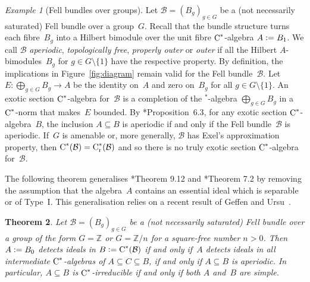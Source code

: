 \documentclass[a4paper]{amsart}
\theoremstyle{plain}
\newtheorem{theorem}{Theorem}
\theoremstyle{definition}
\theoremstyle{remark}
\newtheorem{example}[theorem]{Example}
\numberwithin{theorem}{section}
\numberwithin{equation}{section}
\newcommand*{\nb}{\nobreakdash}
\newcommand*{\Star}{\(^*\)\nobreakdash-}
\newcommand*{\Z}{\mathbb Z}
\newcommand*{\red}{\mathrm{r}}%
\newcommand*{\Cst}{\textup C^*}%
\newcommand*{\B}{\mathcal B}%
\newcommand*{\defeq}{\mathrel{\vcentcolon=}}%
\begin{document}
\begin{example}[Fell bundles over groups]
  \label{ex:group_Fell_bundles}
  Let \(\B=(B_{g})_{g\in G}\) be a (not necessarily saturated) Fell
  bundle over a group~\(G\).
  Recall that the bundle structure turns each fibre~\(B_g\) into a
  Hilbert bimodule over the unit fibre \(\Cst\)\nb-algebra \(A\defeq B_1\).
  We call \(\B\) \emph{aperiodic}, \emph{topologically free},
  \emph{properly outer} or \emph{outer} if all the Hilbert
  \(A\)\nb-bimodules~\(B_g\) for \(g\in G\setminus\{1\}\) have the
  respective property.
  By definition, the implications in Figure~\ref{fig:diagram} remain
  valid for the Fell bundle~\(\B\).
  Let \(E\colon \bigoplus_{g\in G} B_g \to A\) be the identity
  on~\(A\) and zero on~\(B_g\) for all \(g\in G\setminus \{1\}\).
  An exotic section \(\Cst\)\nb-algebra for~\(\B\) is a completion of
  the \Star{}algebra \(\bigoplus_{g\in G} B_g\) in a \(\Cst\)\nb-norm
  that makes~\(E\) bounded.
  By  \cite{Kwasniewski-Meyer:Essential}*{Proposition~6.3}, for any
  exotic section \(\Cst\)\nb-algebra~\(B\), the inclusion \(A\subseteq
  B\) is
  aperiodic if and only if the Fell bundle~\(\B\) is aperiodic.
  If~\(G\) is amenable or, more generally, \(\B\) has Exel's
  approximation property, then \(\Cst(\B)=\Cst_\red(\B)\) and so there
  is no truly exotic section \(\Cst\)\nb-algebra for~\(\B\).
\end{example}

The following theorem generalises
\cite{Kwasniewski-Meyer:Aperiodicity}*{Theorem 9.12} and
\cite{Kwasniewski-Meyer:Aperiodicity_pseudo_expectations}*{Theorem
  7.2} by removing the assumption that the algebra~\(A\) contains an
essential ideal which is separable or of Type~I.
This generalisation relies on a recent result of Geffen and
Ursu~\cite{Geffen-Ursu:Simple_crossed_products}.

\begin{theorem}
  \label{the:special_groups}
  Let \(\B=(B_{g})_{g\in G}\) be a \textup{(}not necessarily
  saturated\textup{)} Fell bundle over a group of the form \(G=\Z\) or
  \(G=\Z/n\) for a square-free number \(n>0\).
  Then \(A\defeq B_0\) detects ideals in  \(B\defeq \Cst(\B)\) if and
  only if~\(A\) detects ideals in all intermediate
  \(\Cst\)\nb-algebras of \(A\subseteq C\subseteq B\), if and only if
  \(A\subseteq B\) is aperiodic.
  In particular, \(A\subseteq B\) is \(\Cst\)\nb-irreducible if and
  only if both \(A\) and~\(B\) are simple.
\end{theorem}
\end{document}
